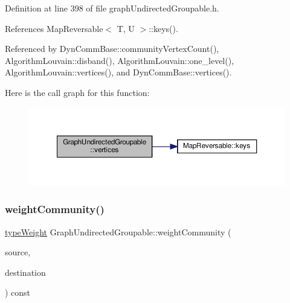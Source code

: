 Definition at line 398 of file graph\+Undirected\+Groupable.\+h.



References Map\+Reversable$<$ T, U $>$\+::keys().



Referenced by Dyn\+Comm\+Base\+::community\+Vertex\+Count(), Algorithm\+Louvain\+::disband(), Algorithm\+Louvain\+::one\+\_\+level(), Algorithm\+Louvain\+::vertices(), and Dyn\+Comm\+Base\+::vertices().

Here is the call graph for this function\+:\nopagebreak
\begin{figure}[H]
\begin{center}
\leavevmode
\includegraphics[width=350pt]{classGraphUndirectedGroupable_aaa5e7db5ba0b5b87ed6af50ef958b9d7_cgraph}
\end{center}
\end{figure}
\mbox{\label{classGraphUndirectedGroupable_a2884361f00176ac8f16afca6feb3e404}} 
\subsubsection{\texorpdfstring{weight\+Community()}{weightCommunity()}}
{\footnotesize\ttfamily \hyperlink{edge_8h_a2e7ea3be891ac8b52f749ec73fee6dd2}{type\+Weight} Graph\+Undirected\+Groupable\+::weight\+Community (\begin{DoxyParamCaption}\item[{const \hyperlink{graphUndirectedGroupable_8h_a914da95c9ea7f14f4b7f875c36818556}{type\+Community} \&}]{source,  }\item[{const \hyperlink{graphUndirectedGroupable_8h_a914da95c9ea7f14f4b7f875c36818556}{type\+Community} \&}]{destination }\end{DoxyParamCaption}) const\hspace{0.3cm}{\ttfamily [inline]}}

